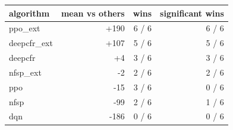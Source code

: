 \begin{tabular}{lrrr}
\toprule
algorithm & mean vs others & wins & significant wins \\
\midrule
ppo\_ext & +190 & 6 / 6 & 6 / 6 \\
deepcfr\_ext & +107 & 5 / 6 & 5 / 6 \\
deepcfr & +4 & 3 / 6 & 3 / 6 \\
nfsp\_ext & -2 & 2 / 6 & 2 / 6 \\
ppo & -15 & 3 / 6 & 0 / 6 \\
nfsp & -99 & 2 / 6 & 1 / 6 \\
dqn & -186 & 0 / 6 & 0 / 6 \\
\bottomrule
\end{tabular}
